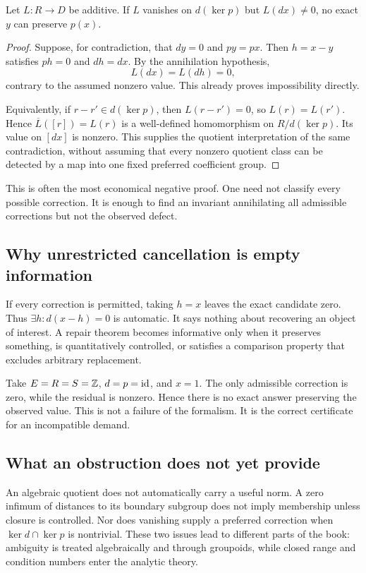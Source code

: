 \begin{KSproposition}\label{KS:KS15}
Let \(L:R\to D\) be additive. If \(L\) vanishes on \(d(\ker p)\) but \(L(dx)\ne0\), no exact \(y\) can preserve \(p(x)\).
\end{KSproposition}
\begin{proof}
Suppose, for contradiction, that $dy=0$ and $py=px$. Then $h=x-y$ satisfies $ph=0$ and $dh=dx$. By the annihilation hypothesis,
\[
 L(dx)=L(dh)=0,
\]
contrary to the assumed nonzero value. This already proves impossibility directly.

Equivalently, if $r-r'\in d(\ker p)$, then $L(r-r')=0$, so $L(r)=L(r')$. Hence $\overline L([r])=L(r)$ is a well-defined homomorphism on $R/d(\ker p)$. Its value on $[dx]$ is nonzero. This supplies the quotient interpretation of the same contradiction, without assuming that every nonzero quotient class can be detected by a map into one fixed preferred coefficient group.
\end{proof}
This is often the most economical negative proof. One need not classify every possible correction. It is enough to find an invariant annihilating all admissible corrections but not the observed defect.

\subsection{Why unrestricted cancellation is empty information}
If every correction is permitted, taking \(h=x\) leaves the exact candidate zero. Thus \(\exists h:d(x-h)=0\) is automatic. It says nothing about recovering an object of interest. A repair theorem becomes informative only when it preserves something, is quantitatively controlled, or satisfies a comparison property that excludes arbitrary replacement.

\begin{KSexample}
Take \(E=R=S=\mathbb Z\), \(d=p=\operatorname{id}\), and \(x=1\). The only admissible correction is zero, while the residual is nonzero. Hence there is no exact answer preserving the observed value. This is not a failure of the formalism. It is the correct certificate for an incompatible demand.
\end{KSexample}

\subsection{What an obstruction does not yet provide}
An algebraic quotient does not automatically carry a useful norm. A zero infimum of distances to its boundary subgroup does not imply membership unless closure is controlled. Nor does vanishing supply a preferred correction when \(\ker d\cap\ker p\) is nontrivial. These two issues lead to different parts of the book: ambiguity is treated algebraically and through groupoids, while closed range and condition numbers enter the analytic theory.

